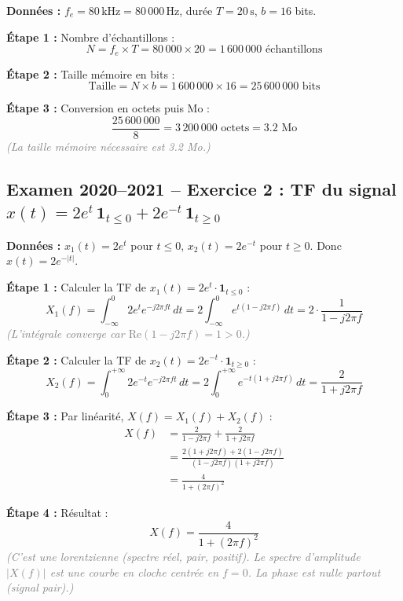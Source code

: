 \documentclass[12pt,a4paper]{article}
\newcommand{\step}[1]{\textcolor{coursbleu}{\textbf{Étape #1 :}}}
\newcommand{\explication}[1]{\textit{\textcolor{gray}{(#1)}}}
\newcommand{\encadre}[1]{\boxed{#1}}
\begin{document}
\begin{tcolorbox}[corrbox, title=Correction Exercice 3]
\textbf{Données :} $f_e = 80\,\text{kHz} = 80\,000\,\text{Hz}$,
durée $T = 20\,\text{s}$, $b = 16$ bits.

\medskip
\step{1} Nombre d'échantillons :
\[
  N = f_e \times T = 80\,000 \times 20 = 1\,600\,000 \text{ échantillons}
\]

\step{2} Taille mémoire en bits :
\[
  \text{Taille} = N \times b = 1\,600\,000 \times 16 = 25\,600\,000 \text{ bits}
\]

\step{3} Conversion en octets puis Mo :
\[
  \frac{25\,600\,000}{8} = 3\,200\,000 \text{ octets} = 3.2 \text{ Mo}
\]
\explication{La taille mémoire nécessaire est 3.2 Mo.}
\end{tcolorbox}

\subsection{Examen 2020--2021 -- Exercice 2 : TF du signal
  \texorpdfstring{$x(t) = 2e^t\,\mathbf{1}_{t\leq 0} + 2e^{-t}\,\mathbf{1}_{t\geq 0}$}%
  {x(t) = 2 exp(t) sur t<=0 + 2 exp(-t) sur t>=0}}

\begin{tcolorbox}[corrbox, title=Correction Exercice 2]
\textbf{Données :} $x_1(t) = 2e^t$ pour $t\leq 0$, $x_2(t) = 2e^{-t}$ pour $t\geq 0$.
Donc $x(t) = 2e^{-|t|}$.

\bigskip
\step{1} Calculer la TF de $x_1(t) = 2e^t\cdot\mathbf{1}_{t\leq 0}$ :
\[
  X_1(f) = \int_{-\infty}^{0} 2e^t e^{-j2\pi ft}\,dt
          = 2\int_{-\infty}^{0} e^{t(1-j2\pi f)}\,dt
          = 2\cdot\frac{1}{1-j2\pi f}
\]
\explication{L'intégrale converge car $\text{Re}(1-j2\pi f) = 1 > 0$.}

\step{2} Calculer la TF de $x_2(t) = 2e^{-t}\cdot\mathbf{1}_{t\geq 0}$ :
\[
  X_2(f) = \int_{0}^{+\infty} 2e^{-t} e^{-j2\pi ft}\,dt
          = 2\int_{0}^{+\infty} e^{-t(1+j2\pi f)}\,dt
          = \frac{2}{1+j2\pi f}
\]

\step{3} Par linéarité, $X(f) = X_1(f) + X_2(f)$ :
\begin{align*}
  X(f) &= \frac{2}{1-j2\pi f} + \frac{2}{1+j2\pi f} \\
       &= \frac{2(1+j2\pi f) + 2(1-j2\pi f)}{(1-j2\pi f)(1+j2\pi f)} \\
       &= \frac{4}{1+(2\pi f)^2}
\end{align*}

\step{4} Résultat :
\[
  \encadre{X(f) = \frac{4}{1 + (2\pi f)^2}}
\]
\explication{C'est une lorentzienne (spectre réel, pair, positif).
Le spectre d'amplitude $|X(f)|$ est une courbe en cloche centrée en $f=0$.
La phase est nulle partout (signal pair).}
\end{tcolorbox}
\end{document}
